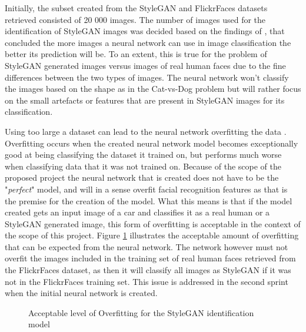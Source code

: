 Initially, the subset created from the StyleGAN and FlickrFaces datasets retrieved consisted of 20 000 images. The number of images used for the identification of StyleGAN images was decided based on the findings of \cite{Nasr2016}, that concluded the more images a neural network can use in image classification the better its prediction will be. To an extent, this is true for the problem of StyleGAN generated images versus images of real human faces due to the fine differences between the two types of images. The neural network won't classify the images based on the shape as in the Cat-vs-Dog problem but will rather focus on the small artefacts or features that are present in StyleGAN images for its classification. 

Using too large a dataset can lead to the neural network overfitting the data \citep{Trask2019}. Overfitting occurs when the created neural network model becomes exceptionally good at being classifying the dataset it trained on, but performs much worse when classifying data that it was not trained on. Because of the scope of the proposed project the neural network that is created does not have to be the "\textit{perfect}" model, and will in a sense overfit facial recognition features as that is the premise for the creation of the model. What this means is that if the model created gets an input image of a car and classifies it as a real human or a StyleGAN generated image, this form of overfitting is acceptable in the context of the scope of this project. Figure \ref{fig:11} illustrates the acceptable amount of overfitting that can be expected from the neural network. The network however must not overfit the images included in the training set of real human faces retrieved from the FlickrFaces dataset, as then it will classify all images as StyleGAN if it was not in the FlickrFaces training set. This issue is addressed in the second sprint when the initial neural network is created. 
  
\begin{figure}[H]%
\centering
{}%
\caption{Acceptable level of Overfitting for the StyleGAN identification model}%
\label{fig:11}%
\end{figure}
  
